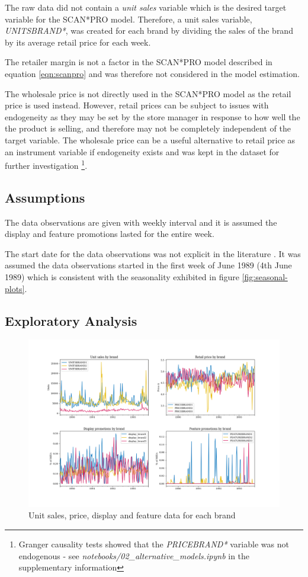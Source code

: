 \documentclass[a4paper,11pt]{article}
\begin{document}
The raw data did not contain a \textit{unit sales} variable which is the desired target variable for the SCAN*PRO model. Therefore, a unit sales variable, \textit{UNITSBRAND*}, was created for each brand by dividing the sales of the brand by its average retail price for each week.

The retailer margin is not a factor in the SCAN*PRO model described in equation \ref{eqn:scanpro} and was therefore not considered in the model estimation.

The wholesale price is not directly used in the SCAN*PRO model as the retail price is used instead. However, retail prices can be subject to issues with endogeneity as they may be set by the store manager in response to how well the the product is selling, and therefore may not be completely independent of the target variable. The wholesale price can be a useful alternative to retail price as an instrument variable if endogeneity exists and was kept in the dataset for further investigation \footnote{Granger causality tests showed that the \textit{PRICEBRAND*} variable was not endogenous - see \textit{notebooks/02\_alternative\_models.ipynb} in the supplementary information}.



\subsection{Assumptions}
The data observations are given with weekly interval and it is assumed the display and feature promotions lasted for the entire week.

The start date for the data observations was not explicit in the literature \citep{srinivasan_promotions_2004}. It was assumed the data observations started in the first week of June 1989 (4th June 1989) which is consistent with the seasonality exhibited in figure \ref{fig:seasonal-plots}.

\subsection{Exploratory Analysis}


\begin{figure}
  \centering
  \includegraphics[scale=0.38]{eda_plots}
  \caption{Unit sales, price, display and feature data for each brand}\label{fig:eda-plots}
\end{figure}
\end{document}
